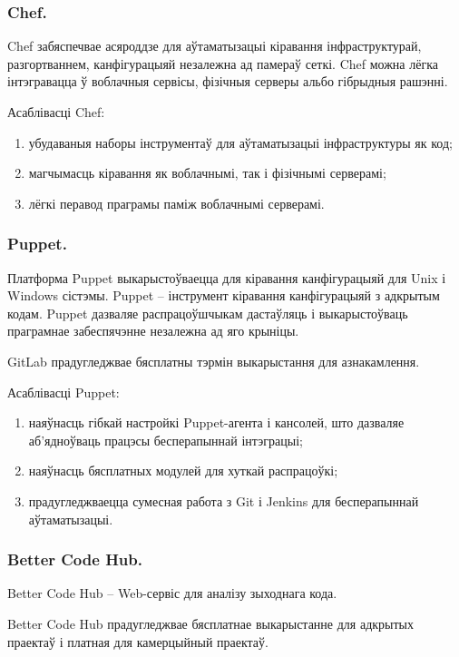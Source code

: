 \subsubsection{Chef.}

Chef забяспечвае асяроддзе для аўтаматызацыі кіравання
інфраструктурай, разгортваннем, канфігурацыяй незалежна
ад памераў сеткі. Chef можна лёгка інтэгравацца ў
воблачныя сервісы, фізічныя серверы альбо гібрыдныя рашэнні.

Асаблівасці Chef:
\begin{enumerate}
    \item убудаваныя наборы інструментаў для аўтаматызацыі
          інфраструктуры як код;
    \item магчымасць кіравання як воблачнымі, так і фізічнымі
          серверамі;
    \item лёгкі перавод праграмы паміж воблачнымі серверамі.
\end{enumerate}

\subsubsection{Puppet.}

Платформа Puppet выкарыстоўваецца для кіравання канфігурацыяй для
Unix і Windows сістэмы.
Puppet -- інструмент кіравання канфігурацыяй з адкрытым кодам.
Puppet дазваляе распрацоўшчыкам дастаўляць і выкарыстоўваць
праграмнае забеспячэнне незалежна ад яго крыніцы.

GitLab прадугледжвае бясплатны тэрмін выкарыстання для азнакамлення.

Асаблівасці Puppet:
\begin{enumerate}
    \item наяўнасць гібкай настройкі Puppet-агента і кансолей, што
          дазваляе аб'ядноўваць працэсы бесперапыннай інтэграцыі;
    \item наяўнасць бясплатных модулей для хуткай распрацоўкі;
    \item прадугледжваецца сумесная работа з Git і Jenkins для
          бесперапыннай аўтаматызацыі.
\end{enumerate}

\subsubsection{Better Code Hub.}

Better Code Hub -- Web-сервіс для аналізу зыходнага кода.

Better Code Hub прадугледжвае бясплатнае выкарыстанне
для адкрытых праектаў і платная для камерцыйный праектаў.

